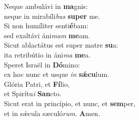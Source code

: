 \evenverse Neque ambulávi in \textbf{ma}gnis:~\*\\
\evenverse neque in mirabíli\textit{bus} \textbf{su}\textbf{per} me.\\
\oddverse Si non humíliter senti\textbf{é}bam:~\*\\
\oddverse sed exaltávi áni\textit{mam} \textbf{me}am.\\
\evenverse Sicut ablactátus est super matre \textbf{su}a:~\*\\
\evenverse ita retribútio in áni\textit{ma} \textbf{me}a.\\
\oddverse Speret Israël in \textbf{Dó}mino:~\*\\
\oddverse ex hoc nunc et usque \textit{in} \textbf{sǽ}\textbf{cu}lum.\\
\evenverse Glória Patri, et \textbf{Fí}lio,~\*\\
\evenverse et Spirítu\textit{i} \textbf{San}cto.\\
\oddverse Sicut erat in princípio, et nunc, et \textbf{sem}per,~\*\\
\oddverse et in sǽcula sæculó\textit{rum}. \textbf{A}men.\\
